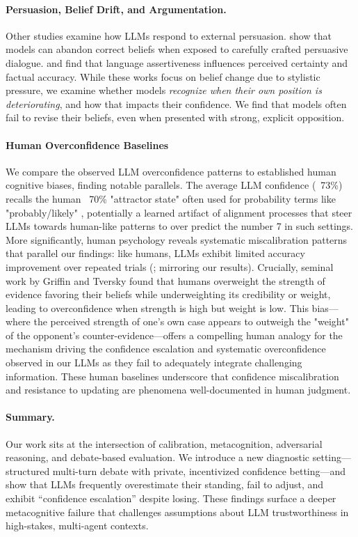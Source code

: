 \documentclass{article}
\begin{document}
\paragraph{Persuasion, Belief Drift, and Argumentation.}
Other studies examine how LLMs respond to external persuasion. \citet{xu2023earthflat} show that models can abandon correct beliefs when exposed to carefully crafted persuasive dialogue. \citet{zhou2023epistemic} and \citet{rivera2023assertive} find that language assertiveness influences perceived certainty and factual accuracy. While these works focus on belief change due to stylistic pressure, we examine whether models \textit{recognize when their own position is deteriorating}, and how that impacts their confidence. We find that models often fail to revise their beliefs, even when presented with strong, explicit opposition.

\paragraph{Human Overconfidence Baselines}
We compare the observed LLM overconfidence patterns to established human cognitive biases, finding notable parallels. The average LLM confidence (~73\%) recalls the human ~70\% "attractor state" often used for probability terms like "probably/likely" \cite{Hashim2024,Mandel2019}, potentially a learned artifact of alignment processes that steer LLMs towards human-like patterns \cite{west2025basemodelsbeataligned} to over predict the number 7 in such settings. More significantly, human psychology reveals systematic miscalibration patterns that parallel our findings: like humans, LLMs exhibit limited accuracy improvement over repeated trials (\cite{Moore2008}; mirroring our results). Crucially, seminal work by Griffin and Tversky \cite{GriffinTversky1992} found that humans overweight the strength of evidence favoring their beliefs while underweighting its credibility or weight, leading to overconfidence when strength is high but weight is low. This bias—where the perceived strength of one's own case appears to outweigh the "weight" of the opponent's counter-evidence—offers a compelling human analogy for the mechanism driving the confidence escalation and systematic overconfidence observed in our LLMs as they fail to adequately integrate challenging information. These human baselines underscore that confidence miscalibration and resistance to updating are phenomena well-documented in human judgment.


\paragraph{Summary.}
Our work sits at the intersection of calibration, metacognition, adversarial reasoning, and debate-based evaluation. We introduce a new diagnostic setting—structured multi-turn debate with private, incentivized confidence betting—and show that LLMs frequently overestimate their standing, fail to adjust, and exhibit ``confidence escalation'' despite losing. These findings surface a deeper metacognitive failure that challenges assumptions about LLM trustworthiness in high-stakes, multi-agent contexts.
\end{document}
